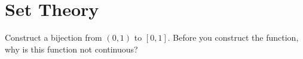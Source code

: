 \section{Set Theory}
\begin{boxProblem}{}
    Construct a bijection from \( (0,1) \) to \( [0,1] \).
    Before you construct the function, why is this function not continuous?
\end{boxProblem}
